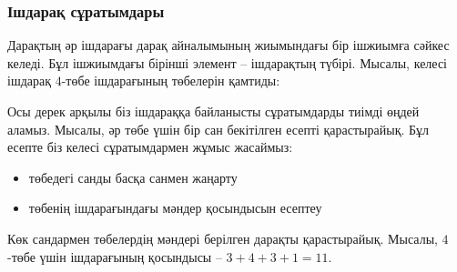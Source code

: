 \subsubsection{Ішдарақ сұратымдары}

Дарақтың әр ішдарағы дарақ айналымының жиымындағы бір ішжиымға сәйкес келеді.
Бұл ішжиымдағы бірінші элемент -- ішдарақтың түбірі.
Мысалы, келесі ішдарақ $4$-төбе ішдарағының 
төбелерін қамтиды:
\begin{center}
\end{center}
Осы дерек арқылы біз ішдараққа байланысты сұратымдарды
тиімді өңдей аламыз.
Мысалы, әр төбе үшін бір сан бекітілген есепті қарастырайық.
Бұл есепте біз келесі сұратымдармен жұмыс жасаймыз:
\begin{itemize}
\item төбедегі санды басқа санмен жаңарту
\item төбенің ішдарағындағы мәндер қосындысын есептеу
\end{itemize}

Көк сандармен төбелердің мәндері берілген дарақты 
қарастырайық.
Мысалы, $4$-төбе үшін ішдарағының қосындысы -- $3+4+3+1=11$.

